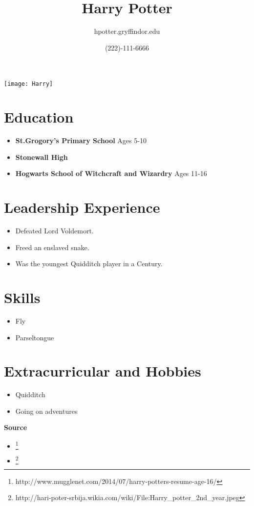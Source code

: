 \documentclass{article}
\title{\textbf{\huge{Harry Potter}}}
\author{hpotter.gryffindor.edu}
\date{(222)-111-6666}
\begin{document}
\maketitle

\texttt{[image: Harry]}
 

\section{Education}
\begin{itemize}
    \item \textbf{St.Grogory's Primary School}
    Ages 5-10
    \item \textbf{Stonewall High}
    \item \textbf{Hogwarts School of Witchcraft and Wizardry}
    Ages 11-16    
\end{itemize}

\section{Leadership Experience}

\begin{itemize}
    \item Defeated Lord Voldemort.
    \item Freed an enslaved snake.
    \item Was the youngest Quidditch player in a Century.
\end{itemize}

\section{Skills}
\begin{itemize}
    \item Fly
    \item Parseltongue
\end{itemize}

\section{Extracurricular and Hobbies}
\begin{itemize}
    \item Quidditch
    \item Going on adventures
\end{itemize}



\textbf{Source}
\begin{itemize}
    \item \thanks{http://www.mugglenet.com/2014/07/harry-potters-resume-age-16/}
    \item \thanks{http://hari-poter-srbija.wikia.com/wiki/File:Harry\_potter\_2nd\_year.jpeg}

\end{itemize}
\end{document}
